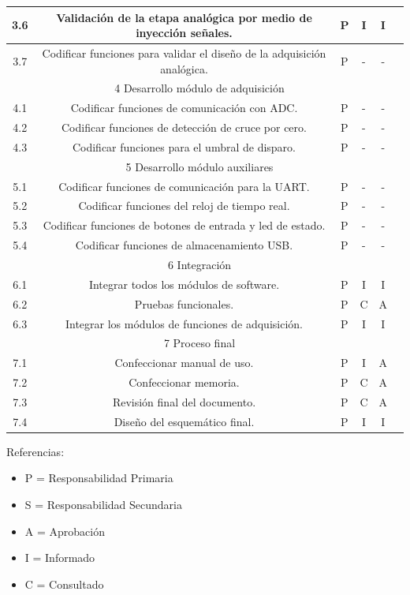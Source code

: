 \documentclass[11pt]{charter}
\begin{document}
\begin{table}[H]
{\begin{tabular}{|c|c|c|c|c|c|}
3.6 & Validación de la etapa analógica por medio de inyección señales. & P & I & I   \\ \hline
3.7 & Codificar funciones para validar el diseño de la adquisición analógica. & P & - & -  \\ \hline
\multicolumn{5}{|c|}{\cellcolor[HTML]{FFCCCC}4 Desarrollo módulo de adquisición} \\ \hline
4.1 & Codificar funciones de comunicación con ADC. & P & - & -   \\ \hline
4.2 & Codificar funciones de detección de cruce por cero. & P & - & -   \\ \hline
4.3 & Codificar funciones para el umbral de disparo. & P & - & -   \\ \hline
\multicolumn{5}{|c|}{\cellcolor[HTML]{FFFF99}5 Desarrollo módulo auxiliares} \\ \hline
5.1 & Codificar funciones de comunicación para la UART. & P & - & -   \\ \hline
5.2 & Codificar funciones del reloj de tiempo real. & P & - & -  \\ \hline
5.3 & Codificar funciones de botones de entrada y led de estado. & P & - & -   \\ \hline
5.4 & Codificar funciones de almacenamiento USB. & P & - & -   \\ \hline
\multicolumn{5}{|c|}{\cellcolor[HTML]{B9E0A5}6 Integración} \\ \hline
6.1 & Integrar todos los módulos de software. & P & I & I   \\ \hline
6.2 & Pruebas funcionales. & P & C & A  \\ \hline
6.3 & Integrar los módulos de funciones de adquisición. & P & I & I  \\ \hline
\multicolumn{5}{|c|}{\cellcolor[HTML]{EA6B66}7 Proceso final} \\ \hline
7.1 & Confeccionar manual de uso. & P & I & A   \\ \hline
7.2 & Confeccionar memoria. & P & C & A   \\ \hline
7.3 & Revisión final del documento. & P & C & A   \\ \hline
7.4 & Diseño del esquemático final. & P & I & I   \\ \hline  
\end{tabular}%
}
\end{table}

{\footnotesize
Referencias:
\begin{itemize}
	\item P = Responsabilidad Primaria
	\item S = Responsabilidad Secundaria
	\item A = Aprobación
	\item I = Informado
	\item C = Consultado
\end{itemize}
} %
\end{document}
